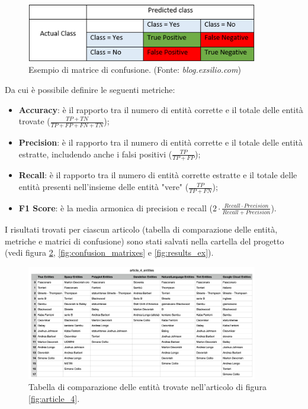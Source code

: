 \documentclass[a4paper,11pt]{article}
\begin{document}
\begin{figure}[H]
\centering
\includegraphics[width=0.9\textwidth]{img/table}
\caption{Esempio di matrice di confusione. (Fonte: \textit{blog.exsilio.com})}
\label{fig:table}
\end{figure}

\clearpage
Da cui è possibile definire le seguenti metriche:

\begin{itemize}
  \item \textbf{Accuracy}: è il rapporto tra il numero di entità corrette e il totale delle entità trovate ($\frac{TP+TN}{TP+FP+FN+TN}$);
  \item \textbf{Precision}: è il rapporto tra il numero di entità corrette e il totale delle entità estratte, includendo anche i falsi positivi ($\frac{TP}{TP+FP}$);
  \item \textbf{Recall}: è il rapporto tra il numero di entità corrette estratte e il totale delle entità presenti nell'insieme delle entità "vere" ($\frac{TP}{TP+FN}$);
  \item \textbf{F1 Score}: è la media armonica di
precision e recall ($2\cdot\frac{Recall \cdot Precision}{Recall + Precision}$).
\end{itemize}

I risultati trovati per ciascun articolo (tabella di comparazione delle entità, metriche e matrici di confusione) sono stati salvati nella cartella del progetto (vedi figura \ref{fig:entities_table}, \ref{fig:confusion_matrixes} e \ref{fig:results_ex}).

\begin{figure}[H]
\centering
\includegraphics[width=0.9\textwidth]{img/entities_table}
\caption{Tabella di comparazione delle entità trovate nell'articolo di figura \ref{fig:article_4}.}
\label{fig:entities_table}
\end{figure}
\end{document}
